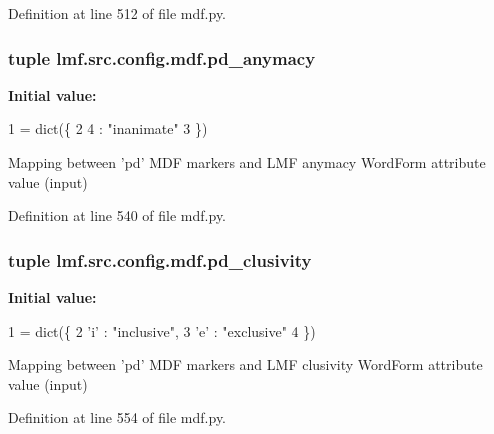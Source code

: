 Definition at line 512 of file mdf.\+py.

\hypertarget{namespacelmf_1_1src_1_1config_1_1mdf_a011f241f41e3620deefe53cbb42286b9}{
\subsubsection[{pd\+\_\+anymacy}]{\setlength{\rightskip}{0pt plus 5cm}tuple lmf.\+src.\+config.\+mdf.\+pd\+\_\+anymacy}}\label{namespacelmf_1_1src_1_1config_1_1mdf_a011f241f41e3620deefe53cbb42286b9}
{\bfseries Initial value\+:}
\begin{DoxyCode}
1 = dict(\{
2     4 : \textcolor{stringliteral}{"inanimate"}
3 \})
\end{DoxyCode}


Mapping between 'pd' M\+D\+F markers and L\+M\+F anymacy Word\+Form attribute value (input) 



Definition at line 540 of file mdf.\+py.

\hypertarget{namespacelmf_1_1src_1_1config_1_1mdf_ac57ebe92cdf841d8d1bfe1e1b94b96bb}{
\subsubsection[{pd\+\_\+clusivity}]{\setlength{\rightskip}{0pt plus 5cm}tuple lmf.\+src.\+config.\+mdf.\+pd\+\_\+clusivity}}\label{namespacelmf_1_1src_1_1config_1_1mdf_ac57ebe92cdf841d8d1bfe1e1b94b96bb}
{\bfseries Initial value\+:}
\begin{DoxyCode}
1 = dict(\{
2     \textcolor{stringliteral}{'i'}     : \textcolor{stringliteral}{"inclusive"},
3     \textcolor{stringliteral}{'e'}     : \textcolor{stringliteral}{"exclusive"}
4 \})
\end{DoxyCode}


Mapping between 'pd' M\+D\+F markers and L\+M\+F clusivity Word\+Form attribute value (input) 



Definition at line 554 of file mdf.\+py.

